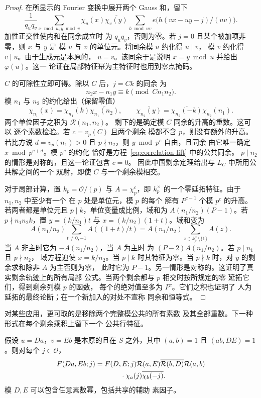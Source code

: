 \begin{proof}
在所显示的 Fourier 变换中展开两个 Gauss 和，留下
\[
 \frac1{q_uq_v}\sum_{x\bmod u,y\bmod v}\chi_u(x)\overline{\chi_v(y)}
 \sum_{h\bmod uv}e\bigl(h(vx-uy-j)/(uv)\bigr).
\]
加性正交性使内和在同余成立时
为 $q_uq_v$，否则为零。若 $j=0$ 且某个被加项非零，则 $x$ 与 $y$ 是
模 $u$ 与 $v$ 的单位元。将同余模 $u$ 约化得 $u\mid v$，
模 $v$ 约化得 $v\mid u$。由于生成元是本原的，
$u=v$。该同余于是说明 $x=y\bmod u$ 并给出 $\varphi(u)$。这一
论证在局部特征幂为主特征时也用到零点掩码。

$C$ 的可除性立即可得。除以 $C$ 后，$j=Ck$ 的同余
为
\[
 n_2x-n_1y\equiv k\pmod{Cn_1n_2}.
\]
模 $n_1$ 与 $n_2$ 的约化给出（保留零值）
\[
 \chi_{n_1}(x)=\chi_{n_1}(k)\overline{\chi_{n_1}(n_2)},\qquad
 \overline{\chi_{n_2}(y)}
 =\overline{\chi_{n_2}(-k)}\chi_{n_2}(n_1).
\]
两个单位因子之积为 $\mathcal R(n_1,n_2)$。
剩下的是确定模 $C$ 同余的升高的重数。这可以
逐个素数检验。若 $c=v_p(C)$ 且两个剩余
模都不含 $p$，则没有额外的升高。若比方说
$d=v_p(n_1)>0$ 且 $p\nmid n_2$，则 $y\bmod p^c$ 自由，且同余
由它唯一确定 $x\bmod p^{c+d}$。模 $p^c$ 的约化
恰好是方程~\eqref{eq:correlation-lift} 中的公共同余。
$p\mid n_2$ 的情形是对称的，且这一论证包含 $c=0$。
因此中国剩余定理给出与 $L_C$ 中所用公共解之间的一个
双射，即使 $C$ 与一个剩余模相交。

对于局部计算，置 $k_p=\mathcal O/(p)$ 与 $A=\chi_p^c$，即
$k_p^\times$ 的一个零延拓特征。由于 $n_1,n_2$ 中至少有一个
在 $p$ 处是单位元，模 $p$ 的每个
解有 $P^{c-1}$ 个模 $p^c$ 的升高。若两者都是单位元且
$p\mid k$，单位变量成比例，域和为
$A(n_1/n_2)(P-1)$。若 $p\nmid n_1n_2k$，置
$y=(k/n_1)t$ 与 $x=(k/n_2)(1+t)$。域和变为
\[
 A(n_1/n_2)\sum_{t\ne0,-1}A((1+t)/t)
 =A(n_1/n_2)\sum_{z\in k_p^\times\setminus\{1\}}A(z).
\]
当 $A$ 非主时它为 $-A(n_1/n_2)$，当 $A$ 为主时
为 $(P-2)A(n_1/n_2)$。若 $p\mid n_1$ 且 $p\nmid n_2$，
域方程迫使 $x=k/n_2$。当 $p\mid k$ 时其特征为零。当
$p\nmid k$ 时，对 $y$ 的剩余求和除非 $A$ 为主否则为零，
此时它为 $P-1$。另一情形是对称的。这证明了真实剩余轨迹上的所有局部
公式。当两个剩余都与 $p$ 相交时按所规定的零
延拓它们，得到剩余列模 $p$ 的函数，
每个的绝对值至多为 $P^c$。它们之积也证明了
人为延拓的最终论断；在一个新加入的对处不宣称
同余和恒等式。
\end{proof}

对某些应用，更可取的是移除两个完整模公共的所有素数
及其全部重数。下一种形式在每个剩余乘积上留下一个
公共行特征。

\begin{lemma}[完备公共支撑相关性]
\label{lem:complete-support-correlation}
假设 $u=Da$，$v=Eb$ 是本原的且在 $S$ 之外，其中
$(a,b)=1$ 且 $(ab,DE)=1$。则对每个 $j\in\mathcal O$，
\begin{equation}
 \begin{split}
 F(Da,Eb;j)={}&F(D,E;j)\mathcal R(a,E)
       \overline{\mathcal R(b,D)}\mathcal R(a,b)\\
 &\hspace{8mm}\cdot\chi_a(j)\overline{\chi_b(-j)}.
 \end{split}
 \label{eq:correlation-child-character}
\end{equation}
模 $D,E$ 可以包含任意素数幂，包括共享的辅助
素因子。
\end{lemma}

